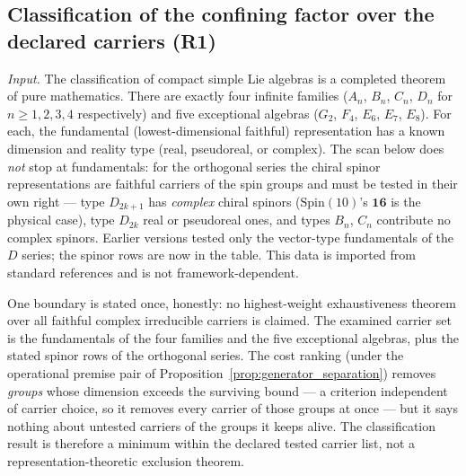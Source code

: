 \documentclass[11pt]{article}
\theoremstyle{definition}
\begin{document}
\subsection{Classification of the confining factor over the declared carriers (R1)}
\label{sec:R1_classification}

\noindent\textit{Input.}  The classification of compact simple Lie algebras
is a completed theorem of pure mathematics.  There are exactly four infinite
families ($A_n$, $B_n$, $C_n$, $D_n$ for $n \ge 1, 2, 3, 4$ respectively)
and five exceptional algebras ($G_2$, $F_4$, $E_6$, $E_7$, $E_8$).
For each, the fundamental (lowest-dimensional faithful) representation
has a known dimension and reality type (real, pseudoreal, or complex).
The scan below does \emph{not} stop at fundamentals: for the
orthogonal series the chiral spinor representations are faithful
carriers of the spin groups and must be tested in their own right ---
type $D_{2k+1}$ has \emph{complex} chiral spinors
($\mathrm{Spin}(10)$'s $\mathbf{16}$ is the physical case), type
$D_{2k}$ real or pseudoreal ones, and types $B_n$, $C_n$ contribute no
complex spinors.  Earlier versions tested only the vector-type
fundamentals of the $D$ series; the spinor rows are now in the table.
This data is imported from standard references
\cite{Humphreys1972,FultonHarris1991} and is not framework-dependent.

One boundary is stated once, honestly: no highest-weight
exhaustiveness theorem over all faithful complex irreducible carriers
is claimed.  The examined carrier set is the fundamentals of the four
families and the five exceptional algebras, plus the stated spinor
rows of the orthogonal series.  The cost ranking (under the
operational premise pair of
Proposition~\ref{prop:generator_separation}) removes \emph{groups}
whose dimension exceeds the surviving bound --- a criterion
independent of carrier choice, so it removes every carrier of those
groups at once --- but it says nothing about untested carriers of the
groups it keeps alive.  The classification result is therefore a
minimum within the declared tested carrier list, not a
representation-theoretic exclusion theorem.
\end{document}
